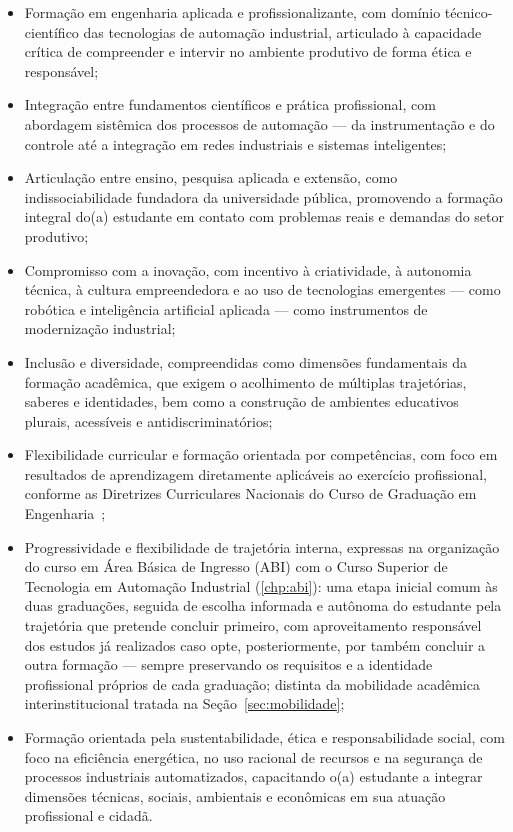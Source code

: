 \begin{itemize}
    \item Formação em engenharia aplicada e profissionalizante, com domínio técnico-científico das tecnologias de automação industrial, articulado à capacidade crítica de compreender e intervir no ambiente produtivo de forma ética e responsável;
    \item Integração entre fundamentos científicos e prática profissional, com abordagem sistêmica dos processos de automação — da instrumentação e do controle até a integração em redes industriais e sistemas inteligentes;
    \item Articulação entre ensino, pesquisa aplicada e extensão, como indissociabilidade fundadora da universidade pública, promovendo a formação integral do(a) estudante em contato com problemas reais e demandas do setor produtivo;
    \item Compromisso com a inovação, com incentivo à criatividade, à autonomia técnica, à cultura empreendedora e ao uso de tecnologias emergentes — como robótica e inteligência artificial aplicada — como instrumentos de modernização industrial;
    \item Inclusão e diversidade, compreendidas como dimensões fundamentais da formação acadêmica, que exigem o acolhimento de múltiplas trajetórias, saberes e identidades, bem como a construção de ambientes educativos plurais, acessíveis e antidiscriminatórios;
    \item Flexibilidade curricular e formação orientada por competências, com foco em resultados de aprendizagem diretamente aplicáveis ao exercício profissional, conforme as Diretrizes Curriculares Nacionais do Curso de Graduação em Engenharia~\cite{cne_ces_2_2019};
    \item Progressividade e flexibilidade de trajetória interna, expressas na organização do curso em Área Básica de Ingresso (ABI) com o Curso Superior de Tecnologia em Automação Industrial (\autoref{chp:abi}): uma etapa inicial comum às duas graduações, seguida de escolha informada e autônoma do estudante pela trajetória que pretende concluir primeiro, com aproveitamento responsável dos estudos já realizados caso opte, posteriormente, por também concluir a outra formação — sempre preservando os requisitos e a identidade profissional próprios de cada graduação; distinta da mobilidade acadêmica interinstitucional tratada na Seção~\ref{sec:mobilidade};
    \item Formação orientada pela sustentabilidade, ética e responsabilidade social, com foco na eficiência energética, no uso racional de recursos e na segurança de processos industriais automatizados, capacitando o(a) estudante a integrar dimensões técnicas, sociais, ambientais e econômicas em sua atuação profissional e cidadã.
\end{itemize}


